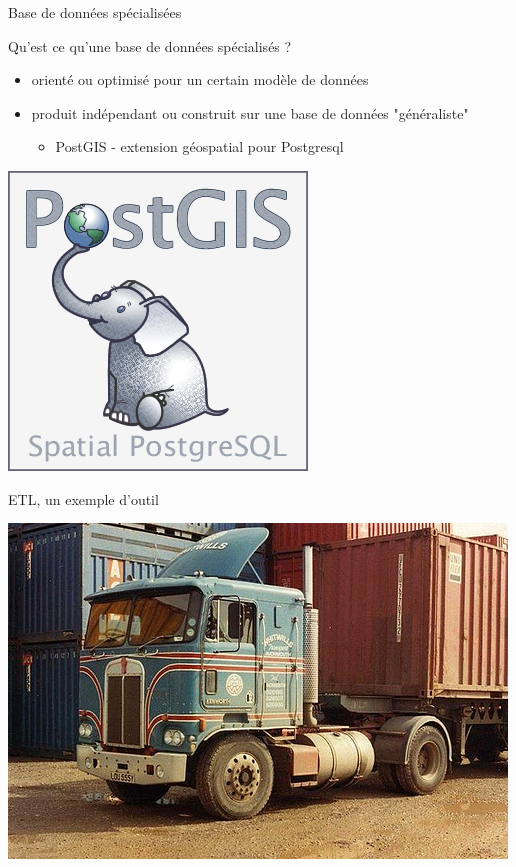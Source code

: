 {  \begin{frame}{Base de données spécialisées}
    \begin{block}{Qu'est ce qu'une base de données spécialisés ?}
      \begin{itemize}
        \item orienté ou optimisé pour un certain modèle de données
        \item produit indépendant ou construit sur une base de données "généraliste"
        \begin{itemize}
         \item PostGIS - extension géospatial pour Postgresql
        \end{itemize}
      \end{itemize}
    \end{block}
    \begin{center}
      \includegraphics[scale=0.4]{../img/PostGIS-database.png}
    \end{center}
  \end{frame}

  \begin{frame}{ETL, un exemple d'outil}
    \begin{center}
      \includegraphics[scale=0.4]{../img/truck.jpg}
    \end{center}


\end{frame}}
